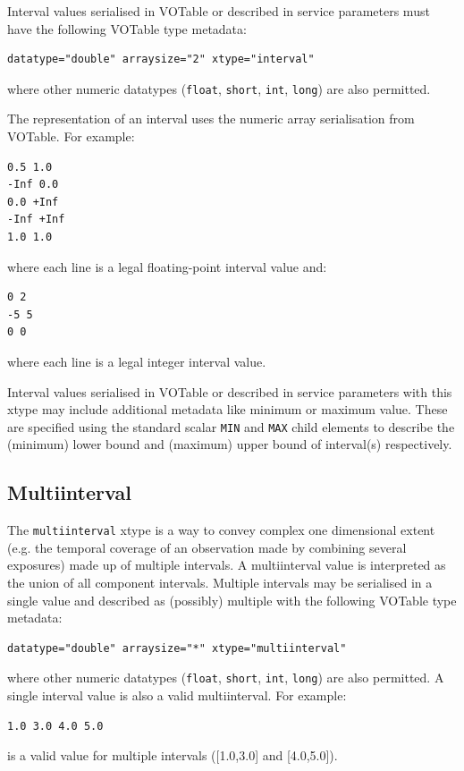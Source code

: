 \documentclass[11pt,letter]{ivoa}
\begin{document}
Interval values serialised in VOTable or described in service parameters must have
the following VOTable type metadata:

\begin{verbatim}
datatype="double" arraysize="2" xtype="interval"
\end{verbatim}
\noindent where other numeric datatypes (\verb|float|, \verb|short|, \verb|int|, \verb|long|)
are also permitted.

The representation of an interval uses the numeric array serialisation from
VOTable. For example:

\begin{verbatim}
0.5 1.0
-Inf 0.0
0.0 +Inf
-Inf +Inf
1.0 1.0
\end{verbatim}
\noindent where each line is a legal floating-point interval value and:

\begin{verbatim}
0 2
-5 5
0 0
\end{verbatim}
\noindent  where each line is a legal integer interval value.

Interval values serialised in VOTable or described in service parameters
with this xtype may include additional metadata like minimum
or maximum value. These are specified using the standard scalar \verb|MIN| and
\verb|MAX| child elements to describe the (minimum) lower bound and (maximum)
upper bound of interval(s) respectively.

\subsection{Multiinterval}
The \verb|multiinterval| xtype is a way to convey complex one dimensional extent
(e.g. the temporal coverage of an observation made by combining several exposures)
made up of multiple intervals. A multiinterval value is interpreted as the union
of all component intervals. Multiple intervals may be serialised in a single value and
described as (possibly) multiple with the following VOTable type metadata:

\begin{verbatim}
datatype="double" arraysize="*" xtype="multiinterval"
\end{verbatim}
\noindent where other numeric datatypes (\verb|float|, \verb|short|, \verb|int|, \verb|long|)
are also permitted. A single interval value is also a valid multiinterval. For example:

\begin{verbatim}
1.0 3.0 4.0 5.0
\end{verbatim}
\noindent is a valid value for multiple intervals ([1.0,3.0] and [4.0,5.0]).
\end{document}
